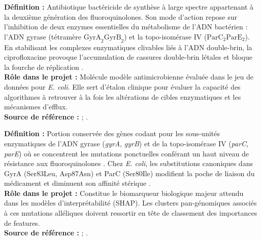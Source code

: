 \documentclass[11pt,a4paper]{article}
\begin{document}
\begin{defbox}
\textbf{Définition :} Antibiotique bactéricide de synthèse à large spectre appartenant à la deuxième génération des fluoroquinolones. Son mode d'action repose sur l'inhibition de deux enzymes essentielles du métabolisme de l'ADN bactérien : l'ADN gyrase (tétramère $\text{GyrA}_2\text{GyrB}_2$) et la topo-isomérase IV ($\text{ParC}_2\text{ParE}_2$). En stabilisant les complexes enzymatiques clivables liés à l'ADN double-brin, la ciprofloxacine provoque l'accumulation de cassures double-brin létales et bloque la fourche de réplication \citep{aldred2014mechanism,hooper2015quinolone}.\\
\textbf{Rôle dans le projet :} Molécule modèle antimicrobienne évaluée dans le jeu de données pour \textit{E. coli}. Elle sert d'étalon clinique pour évaluer la capacité des algorithmes à retrouver à la fois les altérations de cibles enzymatiques et les mécanismes d'efflux.\\
\textbf{Source de référence :} \citet{aldred2014mechanism} ; \citet{hooper2015quinolone}.
\end{defbox}

\begin{defbox}
\textbf{Définition :} Portion conservée des gènes codant pour les sous-unités enzymatiques de l'ADN gyrase (\textit{gyrA}, \textit{gyrB}) et de la topo-isomérase IV (\textit{parC}, \textit{parE}) où se concentrent les mutations ponctuelles conférant un haut niveau de résistance aux fluoroquinolones \citep{hopkins2005mechanisms}. Chez \textit{E. coli}, les substitutions canoniques dans GyrA (Ser83Leu, Asp87Asn) et ParC (Ser80Ile) modifient la poche de liaison du médicament et diminuent son affinité stérique \citep{aldred2014mechanism}.\\
\textbf{Rôle dans le projet :} Constitue le biomarqueur biologique majeur attendu dans les modèles d'interprétabilité (SHAP). Les clusters pan-génomiques associés à ces mutations alléliques doivent ressortir en tête de classement des importances de features.\\
\textbf{Source de référence :} \citet{hopkins2005mechanisms} ; \citet{hooper2015quinolone}.
\end{defbox}
\end{document}
